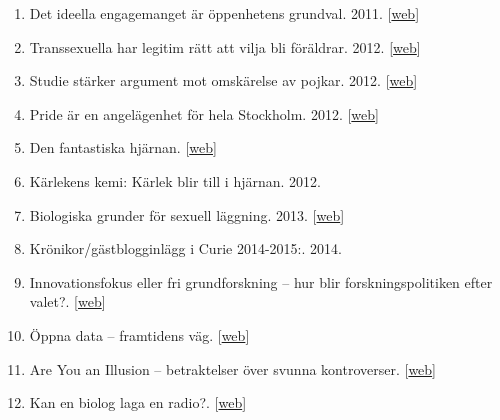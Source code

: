 \documentclass[10pt,a4paper,twocolumn]{article}
\begin{document}
\begin{enumerate}
    \item Det ideella engagemanget är öppenhetens grundval. 2011. [\href{https://drive.google.com/open?id=0B79wnU8V_RoiVHRELWtPc0tSdGs}{web}]

    \item Transsexuella har legitim rätt att vilja bli föräldrar. 2012. [\href{https://drive.google.com/open?id=0B79wnU8V_Roic1QySHZnRHJqY3c}{web}]

    \item Studie stärker argument mot omskärelse av pojkar. 2012. [\href{http://www.ottar.se/artiklar/studier-st-rker-argument-mot-omsk-relse-av-pojkar}{web}]

    \item Pride är en angelägenhet för hela Stockholm. 2012. [\href{http://www.dn.se/debatt/pride-ar-en-angelagenhet-for-hela-stockholm/}{web}]

    \item Den fantastiska hjärnan. [\href{http://fjardeuppgiften.se/tag/gustav-nilsonne/}{web}]

    \item Kärlekens kemi: Kärlek blir till i hjärnan. 2012.

    \item Biologiska grunder för sexuell läggning. 2013. [\href{http://www.rfsu.se/Bildbank/Dokument/Metod-Handledning/Den\%20onaturliga\%20naturen_MQ2.pdf?epslanguage=sv}{web}]

    \item Krönikor/gästblogginlägg i Curie 2014-2015:. 2014.

    \item Innovationsfokus eller fri grundforskning – hur blir forskningspolitiken efter valet?. [\href{https://www.tidningencurie.se/kronikor/innovationsfokus-eller-fri-grundforskning---hur-blir-forskningspolitiken-efter-valet}{web}]

    \item Öppna data – framtidens väg. [\href{https://www.tidningencurie.se/kronikor/oppna-data---framtidens-vag}{web}]

    \item Are You an Illusion – betraktelser över svunna kontroverser. [\href{https://www.tidningencurie.se/kronikor/are-you-an-illusion---betraktelser-over-svunna-kontroverser}{web}]

    \item Kan en biolog laga en radio?. [\href{https://www.tidningencurie.se/kronikor/kan-en-biolog-laga-en-radio}{web}]


\end{enumerate}
\end{document}
